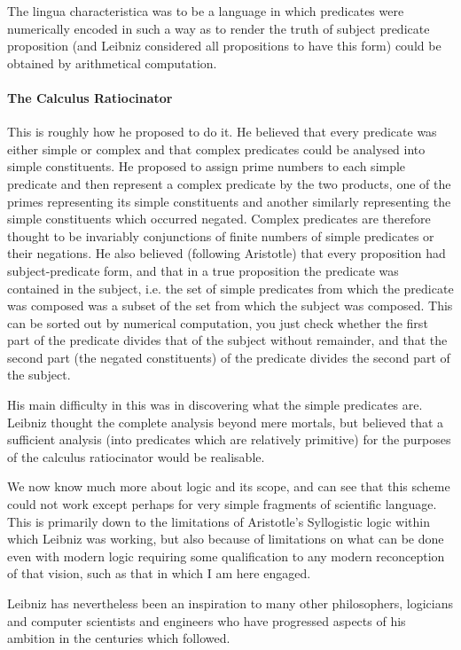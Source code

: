 \documentclass[10pt,titlepage]{book}
\begin{document}
  The lingua characteristica was to be a language in which predicates were numerically encoded in such a way as to render the truth of subject predicate proposition (and Leibniz considered all propositions to have this form) could be obtained by arithmetical computation.

\paragraph{The Calculus Ratiocinator}
This is roughly how he proposed to do it. He believed that every predicate was either simple or complex and that complex predicates could be analysed into simple constituents. He proposed to assign prime numbers to each simple predicate and then represent a complex predicate by the two products, one of the primes representing its simple constituents and another similarly representing the simple constituents which occurred negated.
Complex predicates are therefore thought to be invariably conjunctions of finite numbers of simple predicates or their negations.
He also believed (following Aristotle) that every proposition had subject-predicate form, and that in a true proposition the predicate was contained in the subject, i.e. the set of simple predicates from which the predicate was composed was a subset of the set from which the subject was composed. This can be sorted out by numerical computation, you just check whether the first part of the predicate divides that of the subject without remainder, and that the second part (the negated constituents) of the predicate divides the second part of the subject.

His main difficulty in this was in discovering what the simple predicates are. Leibniz thought the complete analysis beyond mere mortals, but believed that a sufficient analysis (into predicates which are relatively primitive) for the purposes of the calculus ratiocinator would be realisable.

We now know much more about logic and its scope, and can see that this scheme could not work except perhaps for very simple fragments of scientific language.
This is primarily down to the limitations of Aristotle's Syllogistic logic within which Leibniz was working, but also because of limitations on what can be done even with modern logic requiring some qualification to any modern reconception of that vision, such as that in which I am here engaged.

Leibniz has nevertheless been an inspiration to many other philosophers, logicians and computer scientists and engineers who have progressed aspects of his ambition in the centuries which followed.
\end{document}
